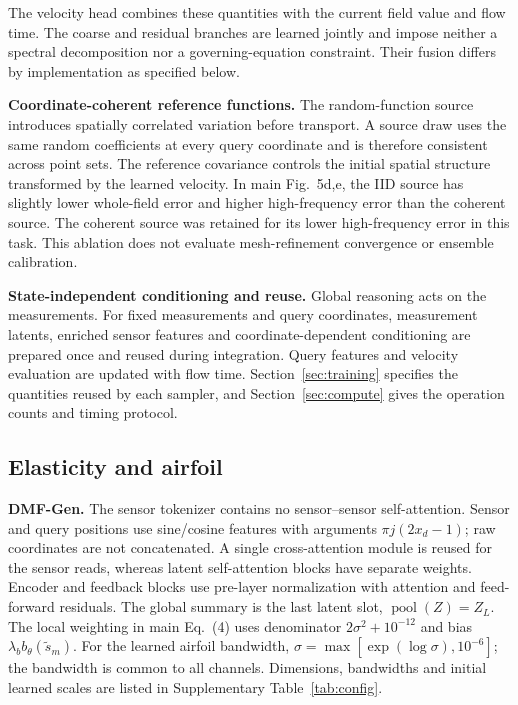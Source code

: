 \documentclass[11pt]{article}
\newcommand{\sisubsection}[1]{%
\FloatBarrier
\Needspace{5\baselineskip}%
\subsection{#1}%
}
\newcommand{\detail}[1]{\par\Needspace{4\baselineskip}\textbf{#1}\enspace}
\begin{document}
The velocity head combines these quantities with the current field value and flow time. The coarse and residual branches are learned jointly and impose neither a spectral decomposition nor a governing-equation constraint. Their fusion differs by implementation as specified below.

\detail{Coordinate-coherent reference functions.} The random-function source introduces spatially correlated variation before transport. A source draw uses the same random coefficients at every query coordinate and is therefore consistent across point sets. The reference covariance controls the initial spatial structure transformed by the learned velocity. In main Fig.~5d,e, the IID source has slightly lower whole-field error and higher high-frequency error than the coherent source. The coherent source was retained for its lower high-frequency error in this task. This ablation does not evaluate mesh-refinement convergence or ensemble calibration.

\detail{State-independent conditioning and reuse.} Global reasoning acts on the measurements. For fixed measurements and query coordinates, measurement latents, enriched sensor features and coordinate-dependent conditioning are prepared once and reused during integration. Query features and velocity evaluation are updated with flow time. Section~\ref{sec:training} specifies the quantities reused by each sampler, and Section~\ref{sec:compute} gives the operation counts and timing protocol.

\sisubsection{Elasticity and airfoil}
\label{subsec:model-irregular}
\detail{DMF-Gen.} The sensor tokenizer contains no sensor--sensor self-attention. Sensor and query positions use sine/cosine features with arguments $\pi j(2x_d-1)$; raw coordinates are not concatenated. A single cross-attention module is reused for the sensor reads, whereas latent self-attention blocks have separate weights. Encoder and feedback blocks use pre-layer normalization with attention and feed-forward residuals. The global summary is the last latent slot, $\operatorname{pool}(Z)=Z_L$. The local weighting in main Eq.~(4) uses denominator $2\sigma^2+10^{-12}$ and bias $\lambda_b b_\theta(\widetilde s_m)$. For the learned airfoil bandwidth, $\sigma=\max[\exp(\log\sigma),10^{-6}]$; the bandwidth is common to all channels. Dimensions, bandwidths and initial learned scales are listed in Supplementary Table~\ref{tab:config}.
\end{document}
